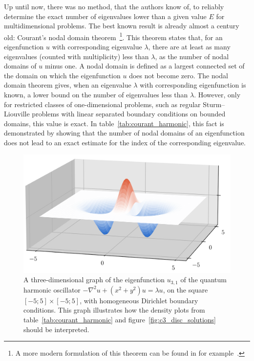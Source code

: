 Up until now, there was no method, that the authors know of, to reliably determine the exact number of eigenvalues lower than a given value $E$ for multidimensional problems. The best known result is already almost a century old: Courant's nodal domain theorem~\cite[vol I, chapter  VI, paragraph 2, theorem 2]{courant_methods_2008}\footnote{A more modern formulation of this theorem can be found in for example~\cite[theorem 1.1]{berard_nodal_2014}.}. This theorem states that, for an eigenfunction $u$ with corresponding eigenvalue $\lambda$, there are at least as many eigenvalues (counted with multiplicity) less than $\lambda$, as the number of nodal domains of $u$ minus one. A nodal domain is defined as a largest connected set of the domain on which the eigenfunction $u$ does not become zero. The nodal domain theorem gives, when an eigenvalue $\lambda$ with corresponding eigenfunction is known, a lower bound on the number of eigenvalues less than $\lambda$. However, only for restricted classes of one-dimensional problems, such as regular Sturm--Liouville problems with linear separated boundary conditions on bounded domains, this value is exact. In table~\ref{tab:courant_harmonic}, this fact is demonstrated by showing that the number of nodal domains of an eigenfunction does not lead to an exact estimate for the index of the corresponding eigenvalue.

\begin{figure}
  \begin{center}
    \includegraphics[width=\linewidth]{img/chapter3/counting/harmonic_3d.png}
    \caption{\label{fig:harmonic_3d} A three-dimensional graph of the eigenfunction $u_{3,1}$ of the quantum harmonic oscillator $-\nabla^2 u + (x^2+y^2) u = \lambda u$, on the square $[-5; 5] \times [-5; 5]$, with homogeneous Dirichlet boundary conditions. This graph illustrates how the density plots from table~\ref{tab:courant_harmonic} and figure~\ref{fig:c3_disc_solutions} should be interpreted.}
  \end{center}
\end{figure}

